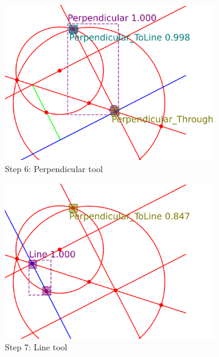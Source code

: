 \begin{figure}[!htb]
     \begin{subfigure}[t]{0.32\textwidth}
         \centering
         \includegraphics[width=\textwidth]{img/Delta-10_example/output_image5.png}
         \caption{Step 6: Perpendicular tool}
         \label{fig:Epsilon12_example_step6}
     \end{subfigure}
     \hfill
     \begin{subfigure}[t]{0.32\textwidth}
         \centering
         \includegraphics[width=\textwidth]{img/Delta-10_example/output_image6.png}
         \caption{Step 7: Line tool}
         \label{fig:Epsilon12_example_fin}
     \end{subfigure}
     \hfill
     \begin{subfigure}[t]{0.32\textwidth}

\end{subfigure}
\end{figure}
